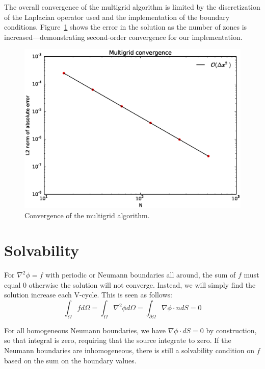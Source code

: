 The overall convergence of the multigrid algorithm is limited by the
discretization of the Laplacian operator used and the implementation
of the boundary conditions.  Figure~\ref{fig:mg:convergence} shows
the error in the solution as the number of zones is increased---demonstrating
second-order convergence for our implementation.

\begin{figure}[t]
\centering
\includegraphics[width=0.85\linewidth]{mg-converge}
\caption[Convergence of the multigrid
  algorithm]{\label{fig:mg:convergence} Convergence of the multigrid
  algorithm. \\ 
  }
\end{figure}


\section{Solvability}
\label{sec:multigrid:solvability}

For $\nabla^2 \phi = f$ with periodic or
Neumann boundaries all around, the sum of $f$ must equal $0$
otherwise the solution will not converge.  Instead, we will simply
find the solution increase each V-cycle.  This is seen as follows:
\begin{equation}
  \int_\Omega f d\Omega = \int_\Omega \nabla^2 \phi d\Omega =
  \int_{\partial \Omega} \nabla \phi \cdot n dS = 0
\end{equation}

For all homogeneous Neumann boundaries, we have $\nabla \phi \cdot dS
= 0$ by construction, so that integral is zero, requiring that the
source integrate to zero.  If the Neumann boundaries are inhomogeneous,
there is still a solvability condition on $f$ based on the sum on
the boundary values.

